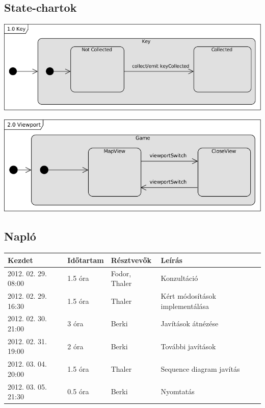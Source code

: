 	\subsection{State-chartok}
\begin{center}\includegraphics[scale=1]{resources/10Key.png}\end{center}	
\begin{center}\includegraphics[scale=1]{resources/20Viewport.png}\end{center}

	
	\subsection{Napló}
    \begin{center} 
        \begin{tabular}{| l | p{1.9cm} | p{2.6cm} | p{6.1cm} |}
            \hline
                Kezdet & Időtartam & Résztvevők & Leírás \\
            \hline \hline 
2012. 02. 29. 08:00 & 1.5 óra & Fodor, Thaler & Konzultáció\\ \hline
2012. 02. 29. 16:30 & 1.5 óra & Thaler & Kért módosítások implementálása\\ \hline
2012. 02. 30. 21:00 & 3 óra & Berki & Javítások átnézése\\ \hline
2012. 02. 31. 19:00 & 2 óra & Berki & További javítások\\ \hline
2012. 03. 04. 20:00 & 1.5 óra & Thaler & Sequence diagram javítás\\ \hline
2012. 03. 05. 21:30 & 0.5 óra & Berki & Nyomtatás\\ \hline

            \hline
        \end{tabular}
    \end{center}

